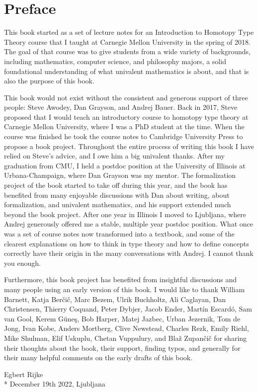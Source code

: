 \chapter*{Preface}

This book started as a set of lecture notes for an Introduction to Homotopy Type Theory course that I taught at Carnegie Mellon University in the spring of 2018. The goal of that course was to give students from a wide variety of backgrounds, including mathematics, computer science, and philosophy majors, a solid foundational understanding of what univalent mathematics is about, and that is also the purpose of this book.

This book would not exist without the consistent and generous support of three people: Steve Awodey, Dan Grayson, and Andrej Bauer. Back in 2017, Steve proposed that I would teach an introductory course to homotopy type theory at Carnegie Mellon University, where I was a PhD student at the time. When the course was finished he took the course notes to Cambridge University Press to propose a book project. Throughout the entire process of writing this book I have relied on Steve's advice, and I owe him a big univalent thanks. After my graduation from CMU, I held a postdoc position at the University of Illinois at Urbana-Champaign, where Dan Grayson was my mentor. The formalization project of the book started to take off during this year, and the book has benefited from many enjoyable discussions with Dan about writing, about formalization, and univalent mathematics, and his support extended much beyond the book project. After one year in Illinois I moved to Ljubljana, where Andrej generously offered me a stable, multiple year postdoc position. What once was a set of course notes now transformed into a textbook, and some of the clearest explanations on how to think in type theory and how to define concepts correctly have their origin in the many conversations with Andrej. I cannot thank you enough.

Furthermore, this book project has benefited from insightful discussions and many people using an early version of this book. I would like to thank
%
William Barnett,
Katja Ber\v{c}i\v{c},
Marc Bezem,
Ulrik Buchholtz,
Ali Caglayan,
Dan Christensen,
Thierry Coquand,
Peter Dybjer,
Jacob Ender,
Mart\'in Escard\'o,
Sam van Gool,
Kerem G\"une\c{s},
Bob Harper,
Matej Jazbec,
Urban Jezernik,
Tom de Jong,
Ivan Kobe,
Anders Mortberg,
Clive Newstead, 
Charles Rezk,
Emily Riehl,
Mike Shulman,
Elif Uskuplu,
Chetan Vuppulury, and
Blaž Zupančič
%
for sharing their thoughts about the book, their support, finding typos, and generally for their many helpful comments on the early drafts of this book.
\\[\baselineskip]
\begin{flushright}
  Egbert Rijke \\*
  December 19th 2022, Ljubljana
\end{flushright}

